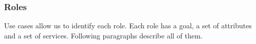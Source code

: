 \documentclass[a4paper,11pt]{report}
\begin{document}
  
  \subsubsection{Roles}
  
  Use cases allow us to identify each role. Each role has a goal, a set of attributes 
  and a set of services. Following paragraphs describe all of them.
  
  
\end{document}
